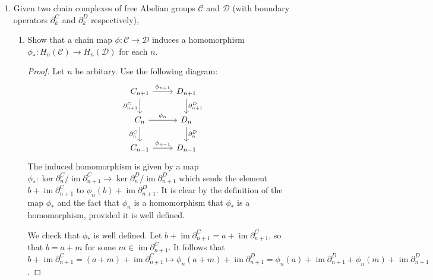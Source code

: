 \documentclass[11pt]{article}
\DeclareMathOperator{\im}{im}
\begin{document}
\begin{enumerate}
\begin{proof}
        By defining $h$ in this manner we have formed a unique arrow since $f$ and $g$ were already given and the arrows from $X,Y$ to $P$ were also given. (we have that $h$ is continuous by definition of the quotient topology and the fact that $g_i$ are continuous, we might be able to use the pasting lemma to see this as well)
    \end{proof}
    \item Given two chain complexes of free Abelian groups $\mathcal{C}$ and $\mathcal{D}$ (with boundary operators $\partial_k^C$ and $\partial_k^D$ respectively), \begin{enumerate}
        \item Show that a chain map $\phi\colon \mathcal{C}\to \mathcal{D}$ induces a homomorphism $\phi_\ast\colon H_n(\mathcal{C})\to H_n(\mathcal{D})$ for each $n$. \begin{proof} Let $n$ be arbitary. Use the following diagram: %
            \[\begin{tikzcd}
                {C_{n+1}} & {D_{n+1}} \\
                {C_{n}} & {D_{n}} \\
                {C_{n-1}} & {D_{n-1}}
                \arrow["{\partial_{n+1}^C}"', from=1-1, to=2-1]
                \arrow["{\partial_{n}^C}"', from=2-1, to=3-1]
                \arrow["{\phi_{n+1}}", from=1-1, to=1-2]
                \arrow["{\phi_{n}}", from=2-1, to=2-2]
                \arrow["{\phi_{n-1}}", from=3-1, to=3-2]
                \arrow["{\partial_{n}^D}", from=2-2, to=3-2]
                \arrow["{\partial_{n+1}^D}", from=1-2, to=2-2]
            \end{tikzcd}\]
            The induced homomorphism is given by a map $\phi_\ast\colon \ker\partial_n^C/\im \partial_{n+1}^C\to \ker\partial_n^D/\im \partial_{n+1}^D$ which sends the element $b+ \im\partial_{n+1}^C$ to $\phi_n(b)+ \im\partial_{n+1}^D$. It is clear by the definition of the map $\phi_\ast$ and the fact that $\phi_n$ is a homomorphism that $\phi_\ast$ is a homomorphism, provided it is well defined.
            
            We check that $\phi_\ast$ is well defined. Let $b+ \im\partial_{n+1}^C = a+ \im\partial_{n+1}^C$, so that $b = a+m$ for some $m\in  \im\partial_{n+1}^C$. It follows that $b+ \im\partial_{n+1}^C = (a+m) + \im\partial_{n+1}^C\mapsto \phi_n(a+m)+ \im\partial_{n+1}^D = \phi_n(a)+ \im\partial_{n+1}^D + \phi_n(m)+ \im\partial_{n+1}^D$.
            

\end{proof}
\end{enumerate}
\end{enumerate}
\end{document}
